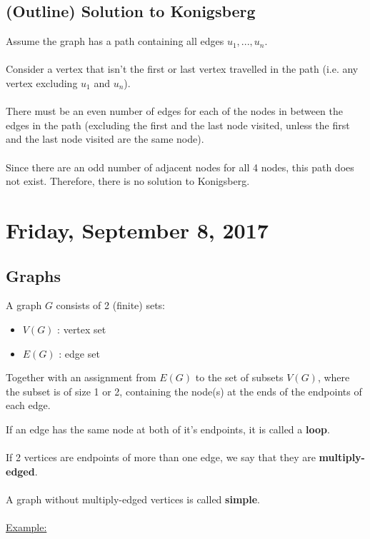 \documentclass[12pt]{article}
\begin{document}
\subsection{(Outline) Solution to Konigsberg}

Assume the graph has a path containing all edges $u_1,...,u_n$.\\
\\
Consider a vertex that isn't the first or last vertex travelled in the path (i.e. any vertex excluding $u_1$ and $u_n$).\\
\\
There must be an even number of edges for each of the nodes in between the edges in the path (excluding the first and the last node visited, unless the first and the last node visited are the same node).\\
\\
Since there are an odd number of adjacent nodes for all 4 nodes, this path does not exist. Therefore, there is no solution to Konigsberg.

\newpage

\section{Friday, September 8, 2017}

\subsection{Graphs}

\begin{tcolorbox}[title=Definition: Graphs]
	A graph $G$ consists of 2 (finite) sets:
	\begin{itemize}
		\item{$V(G)$ : vertex set}
		\item{$E(G)$ : edge set}
	\end{itemize}

	Together with an assignment from $E(G)$ to the set of subsets $V(G)$, where the subset is of size 1 or 2, containing the node(s) at the ends of the endpoints of each edge.
\end{tcolorbox}

If an edge has the same node at both of it's endpoints, it is called a \textbf{loop}.\\
\\
If 2 vertices are endpoints of more than one edge, we say that they are \textbf{multiply-edged}.\\
\\
A graph without multiply-edged vertices is called \textbf{simple}.\\
\\
\underline{Example:}
\end{document}
